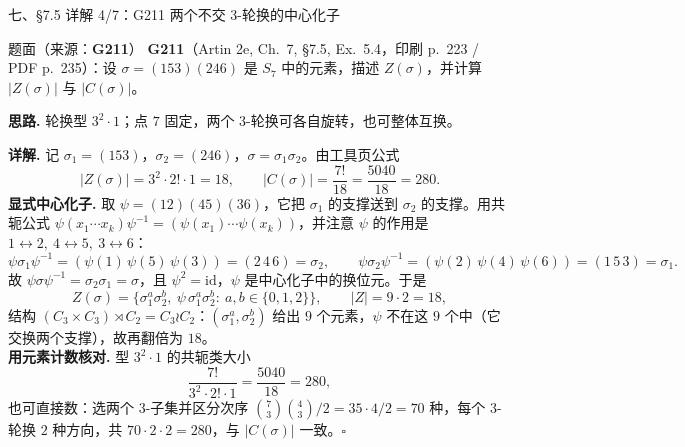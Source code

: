 \documentclass[aspectratio=169,10pt,fontset=none]{ctexbeamer}
\newcommand{\ex}[1]{\textcolor{accent}{\footnotesize\bfseries #1}}
\newcommand{\key}[1]{\textcolor{ink}{\bfseries #1}}
\begin{document}
\begin{frame}[t]{七、\S7.5 详解 4/7：G211 两个不交 3-轮换的中心化子}
\label{ex:G211}
\scriptsize
\begin{block}{\footnotesize 题面（来源：\ex{G211}）}
\scriptsize
\ex{G211}（Artin 2e, Ch.~7, \S7.5, Ex.~5.4，印刷 p.~223 / PDF p.~235）：设 $\sigma=(153)(246)$ 是 $S_7$ 中的元素，描述 $Z(\sigma)$，并计算 $|Z(\sigma)|$ 与 $|C(\sigma)|$。
\end{block}
\key{思路.} 轮换型 $3^2\cdot1$；点 $7$ 固定，两个 $3$-轮换可各自旋转，也可整体互换。

\key{详解.} 记 $\sigma_1=(153)$，$\sigma_2=(246)$，$\sigma=\sigma_1\sigma_2$。由工具页公式
\[ |Z(\sigma)|=3^2\cdot2!\cdot1=18,\qquad |C(\sigma)|=\frac{7!}{18}=\frac{5040}{18}=280. \]
\key{显式中心化子.} 取 $\psi=(12)(45)(36)$，它把 $\sigma_1$ 的支撑送到 $\sigma_2$ 的支撑。用共轭公式 $\psi(x_1\cdots x_k)\psi^{-1}=(\psi(x_1)\cdots\psi(x_k))$，并注意 $\psi$ 的作用是 $1\leftrightarrow2,\ 4\leftrightarrow5,\ 3\leftrightarrow6$：
\[ \psi\sigma_1\psi^{-1}=(\psi(1)\,\psi(5)\,\psi(3))=(2\,4\,6)=\sigma_2,\qquad \psi\sigma_2\psi^{-1}=(\psi(2)\,\psi(4)\,\psi(6))=(1\,5\,3)=\sigma_1. \]
故 $\psi\sigma\psi^{-1}=\sigma_2\sigma_1=\sigma$，且 $\psi^2=\mathrm{id}$，$\psi$ 是中心化子中的换位元。于是
\[ Z(\sigma)=\bigl\{\sigma_1^a\sigma_2^b,\ \psi\,\sigma_1^a\sigma_2^b:\ a,b\in\{0,1,2\}\bigr\},\qquad |Z|=9\cdot2=18, \]
结构 $(C_3\times C_3)\rtimes C_2=C_3\wr C_2$：$(\sigma_1^a,\sigma_2^b)$ 给出 $9$ 个元素，$\psi$ 不在这 $9$ 个中（它交换两个支撑），故再翻倍为 $18$。\\
\key{用元素计数核对.} 型 $3^2\cdot1$ 的共轭类大小
\[ \frac{7!}{3^2\cdot2!\cdot1}=\frac{5040}{18}=280, \]
也可直接数：选两个 $3$-子集并区分次序 $\binom73\binom43/2=35\cdot4/2=70$ 种，每个 $3$-轮换 $2$ 种方向，共 $70\cdot2\cdot2=280$，与 $|C(\sigma)|$ 一致。$\square$
\end{frame}
\end{document}
